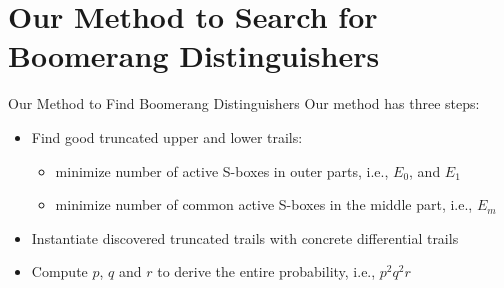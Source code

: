 \documentclass[table,aspectratio=169]{beamer}
\begin{document}
\section{Our Method to Search for Boomerang Distinguishers}

\begin{frame}{Our Method to Find Boomerang Distinguishers}
	Our method has three steps:
	\begin{itemize}		
		\item<1->[\faArrowCircleRight] Find good truncated upper and lower trails:
		\begin{itemize}
			\item<2-> minimize number of active S-boxes in outer parts, i.e., $E_{0}$, and  $E_{1}$
			\item<2-> minimize number of common active S-boxes in the middle part, i.e., $E_{m}$
		\end{itemize}		
		\item<3->[\faArrowCircleRight] Instantiate discovered truncated trails with concrete differential trails
		\item<4->[\faArrowCircleRight] Compute $p$, $q$ and $r$ to derive the entire probability, i.e.,  $p^{2}q^{2}r$
	\end{itemize}
\end{frame}
\end{document}
